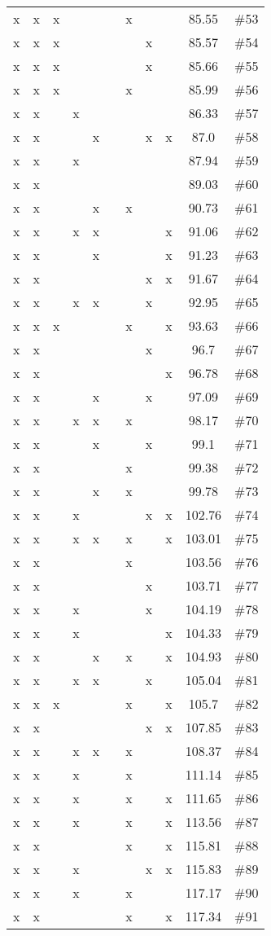 \begin{longtable}{|c|c|c|c|c|c|c|c|c|c|c|}
 x & x & x & & & & x & & &85.55 & \#53 \\
 x & x & x & & & & & x & &85.57 & \#54 \\
 x & x & x & & & & & x & &85.66 & \#55 \\
 x & x & x & & & & x & & &85.99 & \#56 \\
 x & x & & x & & & & & &86.33 & \#57 \\
 x & x & & & x & & & x & x &87.0 & \#58 \\
 x & x & & x & & & & & &87.94 & \#59 \\
 x & x & & & & & & & &89.03 & \#60 \\
 x & x & & & x & & x & & &90.73 & \#61 \\
 x & x & & x & x & & & & x &91.06 & \#62 \\
 x & x & & & x & & & & x &91.23 & \#63 \\
 x & x & & & & & & x & x &91.67 & \#64 \\
 x & x & & x & x & & & x & &92.95 & \#65 \\
 x & x & x & & & & x & & x &93.63 & \#66 \\
 x & x & & & & & & x & &96.7 & \#67 \\
 x & x & & & & & & & x &96.78 & \#68 \\
 x & x & & & x & & & x & &97.09 & \#69 \\
 x & x & & x & x & & x & & &98.17 & \#70 \\
 x & x & & & x & & & x & &99.1 & \#71 \\
 x & x & & & & & x & & &99.38 & \#72 \\
 x & x & & & x & & x & & &99.78 & \#73 \\
 x & x & & x & & & & x & x &102.76 & \#74 \\
 x & x & & x & x & & x & & x &103.01 & \#75 \\
 x & x & & & & & x & & &103.56 & \#76 \\
 x & x & & & & & & x & &103.71 & \#77 \\
 x & x & & x & & & & x & &104.19 & \#78 \\
 x & x & & x & & & & & x &104.33 & \#79 \\
 x & x & & & x & & x & & x &104.93 & \#80 \\
 x & x & & x & x & & & x & &105.04 & \#81 \\
 x & x & x & & & & x & & x &105.7 & \#82 \\
 x & x & & & & & & x & x &107.85 & \#83 \\
 x & x & & x & x & & x & & &108.37 & \#84 \\
 x & x & & x & & & x & & &111.14 & \#85 \\
 x & x & & x & & & x & & x &111.65 & \#86 \\
 x & x & & x & & & x & & x &113.56 & \#87 \\
 x & x & & & & & x & & x &115.81 & \#88 \\
 x & x & & x & & & & x & x &115.83 & \#89 \\
 x & x & & x & & & x & & &117.17 & \#90 \\
 x & x & & & & & x & & x &117.34 & \#91 \\
\end{longtable}
\normalsize